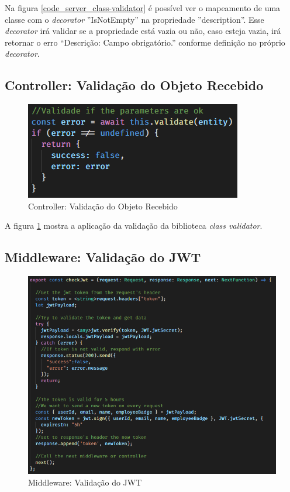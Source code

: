 Na figura \ref{code_server_class-validator} é possível ver o mapeamento de uma classe com o \textit{decorator} ''IsNotEmpty'' na propriedade ''description''. Esse \textit{decorator} irá validar se a propriedade está vazia ou não, caso esteja vazia, irá retornar o erro ``Descrição: Campo obrigatório.'' conforme definição no próprio \textit{decorator}.

\subsection{Controller: Validação do Objeto Recebido}

\begin{figure}[htb]
	\caption{\label{code_server_class-validate}Controller: Validação do Objeto Recebido}
	\begin{center}
		\includegraphics[scale=1.60]{./Figuras/code/server/controller-class-validator.png}
	\end{center}
\end{figure}

A figura \ref{code_server_class-validate} mostra a aplicação da validação da biblioteca \textit{class validator}.

\newpage
\subsection{Middleware: Validação do JWT}

\begin{figure}[htb]
	\caption{\label{code_server_middleware}Middleware: Validação do JWT}
	\begin{center}
		\includegraphics[scale=0.80]{./Figuras/code/server/middleware.png}
	\end{center}
\end{figure}

